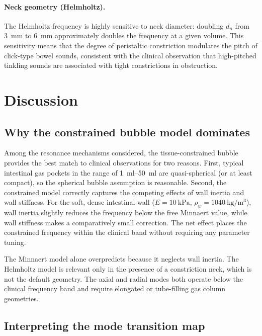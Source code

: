 \documentclass[12pt]{article}
\begin{document}
\paragraph{Neck geometry (Helmholtz).}
The Helmholtz frequency is highly sensitive to neck diameter: doubling $d_n$
from \SI{3}{\milli\metre} to \SI{6}{\milli\metre} approximately doubles the
frequency at a given volume.  This sensitivity means that the degree of
peristaltic constriction modulates the pitch of click-type bowel sounds,
consistent with the clinical observation that high-pitched tinkling sounds
are associated with tight constrictions in obstruction.

\section{Discussion}
\label{sec:discussion}

\subsection{Why the constrained bubble model dominates}
\label{sec:why_constrained}

Among the resonance mechanisms considered, the tissue-constrained bubble
provides the best match to clinical observations for two reasons.  First,
typical intestinal gas pockets in the range of
\SIrange{1}{50}{\milli\litre} are quasi-spherical (or at least compact), so
the spherical bubble assumption is reasonable.  Second, the constrained model
correctly captures the competing effects of wall inertia and wall stiffness.
For the soft, dense intestinal wall ($E = \SI{10}{\kilo\pascal}$,
$\rho_w = \SI{1040}{\kilogram\per\metre\cubed}$), wall inertia slightly
reduces the frequency below the free Minnaert value, while wall stiffness
makes a comparatively small correction.  The net effect places the
constrained frequency within the clinical band without requiring any
parameter tuning.

The Minnaert model alone overpredicts because it neglects wall inertia.  The
Helmholtz model is relevant only in the presence of a constriction neck, which
is not the default geometry.  The axial and radial modes both operate below the clinical
frequency band and require elongated or tube-filling gas column geometries.

\subsection{Interpreting the mode transition map}
\label{sec:interpreting_map}
\end{document}
